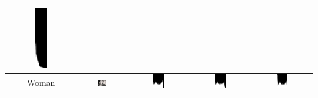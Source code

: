 \documentclass[12pt,a4paper]{article}
\begin{document}
\begin{center}
\begin{longtable}{|c|c|c|c|c|}
           \includegraphics[width=0.2\textwidth]{./latexSource/tiger_R_EQUA.png} \\
    \hline
    Woman & \includegraphics[width=0.2\textwidth]{./latexSource/woman_process.png} & 
           \includegraphics[width=0.2\textwidth]{./latexSource/woman_B_EQUA.png} & 
           \includegraphics[width=0.2\textwidth]{./latexSource/woman_G_EQUA.png} & 
           \includegraphics[width=0.2\textwidth]{./latexSource/woman_R_EQUA.png} \\

\end{longtable}
\end{center}
\end{document}
